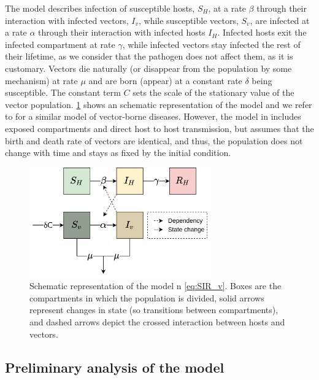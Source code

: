 The model describes infection of susceptible hosts, $S_H$, at a rate
$\beta$ through their interaction with infected vectors, $I_v$, while
susceptible vectors, $S_v$, are infected at a rate $\alpha$ through their
interaction with infected hosts $I_H$. Infected hosts exit the infected
compartment at rate $\gamma$, while infected vectors stay infected the rest of
their lifetime, as we consider that the pathogen does not affect them, as it is
customary. Vectors die naturally (or disappear from the population by some
mechanism) at rate $\mu$ and are born (appear) at a constant rate $\delta$
being susceptible. The constant term $C$ sets the scale of the stationary value
of the vector population. \cref{fig:model_diagram} shows an schematic
representation of the model and we refer to \cite{Brauer2016} for a similar
model of vector-borne diseases. However, the model in \cite{Brauer2016}
includes exposed compartments and direct host to host transmission, but assumes
that the birth and death rate of vectors are identical, and thus, the
population does not change with time and stays as fixed by the initial
condition.
\begin{figure}[H]
    \centering
    \includegraphics[width=0.7\textwidth]{Figures/Diagram.png}
    \caption{Schematic representation of the model n \cref{eq:SIR_v}. Boxes
        are the compartments in which the population is divided, solid arrows
        represent
        changes in state (so transitions between compartments), and dashed
        arrows
        depict the crossed interaction between hosts and vectors.}
    \label{fig:model_diagram}
\end{figure}

\subsection{Preliminary analysis of the model} \label{sec:Prelimanalysis}

